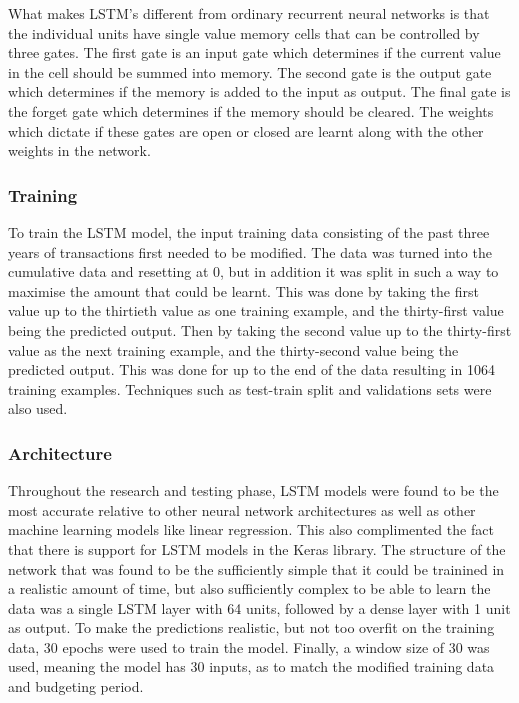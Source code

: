What makes LSTM's different from ordinary recurrent neural networks is that the individual units have single value memory cells that can be controlled by three gates. The first gate is an input gate which determines if the current value in the cell should be summed into memory. The second gate is the output gate which determines if the memory is added to the input as output. The final gate is the forget gate which determines if the memory should be cleared. The weights which dictate if these gates are open or closed are learnt along with the other weights in the network.

\subsubsection{Training}
To train the LSTM model, the input training data consisting of the past three years of transactions first needed to be modified. The data was turned into the cumulative data and resetting at 0, but in addition it was split in such a way to maximise the amount that could be learnt. This was done by taking the first value up to the thirtieth value as one training example, and the thirty-first value being the predicted output. Then by taking the second value up to the thirty-first value as the next training example, and the thirty-second value being the predicted output. This was done for up to the end of the data resulting in 1064 training examples. Techniques such as test-train split and validations sets were also used.


\subsubsection{Architecture}
Throughout the research and testing phase, LSTM models were found to be the most accurate relative to other neural network architectures as well as other machine learning models like linear regression. This also complimented the fact that there is support for LSTM models in the Keras library. The structure of the network that was found to be the sufficiently simple that it could be trainined in a realistic amount of time, but also sufficiently complex to be able to learn the data was a single LSTM layer with 64 units, followed by a dense layer with 1 unit as output. To make the predictions realistic, but not too overfit on the training data, 30 epochs were used to train the model. Finally, a window size of 30 was used, meaning the model has 30 inputs, as to match the modified training data and budgeting period.

